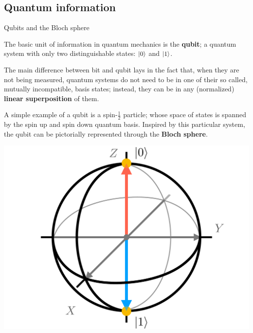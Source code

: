 \documentclass[9pt, handout, aspectratio=169]{beamer}	%
\begin{document}

\subsection{Quantum information}

\begin{frame}{Qubits and the Bloch sphere}

	\begin{multicols}{2}

		The basic unit of information in quantum mechanics is the \textbf{qubit}; a quantum system with only two distinguishable states: $\ket{0}$ and $\ket{1}$.

		\medskip

		The main difference between bit and qubit lays in the fact that, when they are not being measured, quantum systems do not need to be in one of their so called, mutually incompatible, basis states; instead, they can be in any (normalized) \textbf{linear superposition} of them.

		\medskip

		A simple example of a qubit is a spin-$\frac{1}{2}$ particle; whose space of states is spanned by the spin up and spin down quantum basis. Inspired by this particular system, the qubit can be pictorially represented through the \textbf{Bloch sphere}.


		\columnbreak

		\begin{center}
			\includegraphics[width=.40\paperwidth]{Figures/quantum-background/bloch-sphere}
		\end{center}

	\end{multicols}

\end{frame}
\end{document}
